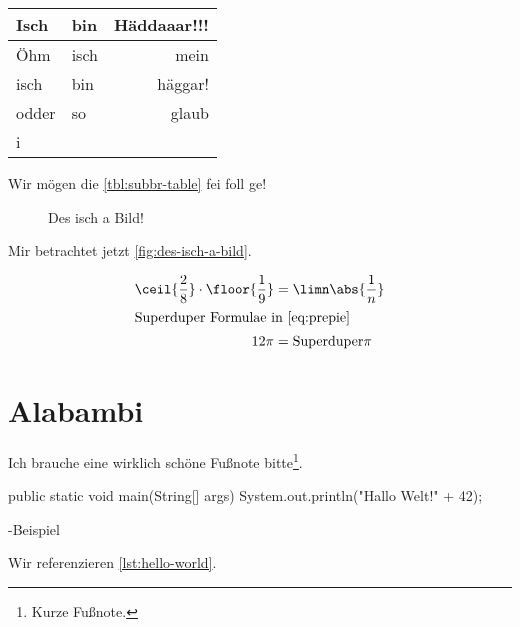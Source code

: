 \documentclass[userip,ngerman]{lecture-digital}
\begin{document}
\begin{table}[H]
    \centering%
    \label{tbl:subbr-table}
    \begin{tabular}{llr}
        \toprule
            Isch & bin & Häddaaar!!! \\
        \midrule
            Öhm & isch & mein \\
            isch & bin & häggar!\\
            odder & so & glaub \\
            i \\
        \bottomrule
    \end{tabular}
\end{table}
Wir mögen die \autoref{tbl:subbr-table} fei foll ge!
\Blindtext[1]
\begin{figure*}
    \centering{}
    \caption[Des isch a breites Bild!]{Des isch a Bild!}
    \label{fig:des-isch-a-bild}
\end{figure*}
Mir betrachtet jetzt \autoref{fig:des-isch-a-bild}.
\Blindtext[1]
\begin{wide}
    \begin{align}
        \ceil{\frac{2}{8}} \cdot \floor{\frac{1}{9}}& = \limn\abs{\frac{1}{n}} \label{eq:prepie}\\
        \intertext{Superduper Formulae in \autoref{eq:prepie}}
        12 \pi &= \text{Superduper}\pi
    \end{align}
\end{wide}
\Blindtext[8]
\section{Alabambi}
Ich brauche eine wirklich schöne Fußnote bitte\footnote{Kurze Fußnote.}.
\begin{code*}
\centering\begin{minipage}{0.8\linewidth}
\begin{java}
public static void main(String[] args) {
    System.out.println("Hallo Welt!" + 42);
}
\end{java}
\end{minipage}
\caption{-Beispiel}
\label{lst:hello-world}
\end{code*}
Wir referenzieren \autoref{lst:hello-world}.
\Blindtext[6]
\end{document}
